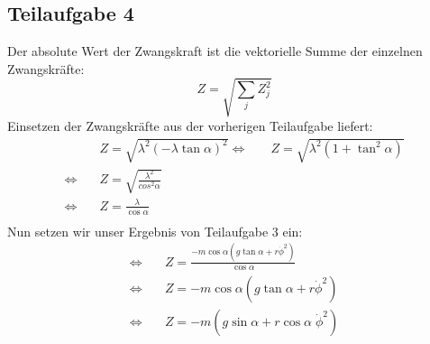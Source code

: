 \documentclass[a4paper,german,12pt,smallheadings]{scrartcl}
\begin{document}
\subsection*{Teilaufgabe 4}
Der absolute Wert der Zwangskraft ist die vektorielle Summe der einzelnen Zwangskräfte:
\begin{equation*}
Z=\sqrt{\sum \limits_j Z_j^2}
\end{equation*}
Einsetzen der Zwangskräfte aus der vorherigen Teilaufgabe liefert:
\begin{align*}
& \quad Z=\sqrt{\lambda^2\left(-\lambda \tan \alpha\right)^2}
\Leftrightarrow & \quad Z=\sqrt{\lambda^2(1+\tan^2 \alpha)}\\
\Leftrightarrow & \quad Z=\sqrt{\frac{\lambda^2}{cos^2 \alpha}}\\
\Leftrightarrow & \quad Z=\frac{\lambda}{\cos \alpha}\\
\end{align*}
Nun setzen wir unser Ergebnis von Teilaufgabe 3 ein:
\begin{align*}
\Leftrightarrow & \quad Z=\frac{-m \cos \alpha \left(g \tan \alpha+r\dot{\phi}^2\right)}{\cos \alpha}\\
\Leftrightarrow & \quad Z=-m \cos \alpha \left(g \tan \alpha+r\dot{\phi}^2\right)\\
\Leftrightarrow & \quad Z=-m \left(g \sin \alpha+r \cos \alpha \; \dot{\phi}^2\right)
\end{align*}
\end{document}
